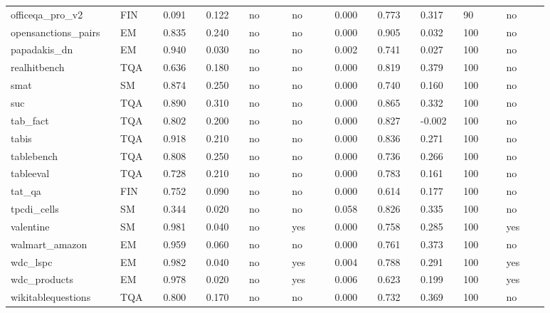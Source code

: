 \begin{landscape}
\begin{longtable}{p{0.147\linewidth}p{0.073\linewidth}p{0.073\linewidth}p{0.073\linewidth}p{0.073\linewidth}p{0.073\linewidth}p{0.073\linewidth}p{0.073\linewidth}p{0.073\linewidth}p{0.073\linewidth}p{0.073\linewidth}}
officeqa\_\allowbreak{}pro\_\allowbreak{}v2 & FIN & 0.091 & 0.122 & no & no & 0.000 & 0.773 & 0.317 & 90 & no \\
opensanctions\_\allowbreak{}pairs & EM & 0.835 & 0.240 & no & no & 0.000 & 0.905 & 0.032 & 100 & no \\
papadakis\_\allowbreak{}dn & EM & 0.940 & 0.030 & no & no & 0.002 & 0.741 & 0.027 & 100 & no \\
realhitbench & TQA & 0.636 & 0.180 & no & no & 0.000 & 0.819 & 0.379 & 100 & no \\
smat & SM & 0.874 & 0.250 & no & no & 0.000 & 0.740 & 0.160 & 100 & no \\
suc & TQA & 0.890 & 0.310 & no & no & 0.000 & 0.865 & 0.332 & 100 & no \\
tab\_\allowbreak{}fact & TQA & 0.802 & 0.200 & no & no & 0.000 & 0.827 & -0.002 & 100 & no \\
tabis & TQA & 0.918 & 0.210 & no & no & 0.000 & 0.836 & 0.271 & 100 & no \\
tablebench & TQA & 0.808 & 0.250 & no & no & 0.000 & 0.736 & 0.266 & 100 & no \\
tableeval & TQA & 0.728 & 0.210 & no & no & 0.000 & 0.783 & 0.161 & 100 & no \\
tat\_\allowbreak{}qa & FIN & 0.752 & 0.090 & no & no & 0.000 & 0.614 & 0.177 & 100 & no \\
tpcdi\_\allowbreak{}cells & SM & 0.344 & 0.020 & no & no & 0.058 & 0.826 & 0.335 & 100 & no \\
valentine & SM & 0.981 & 0.040 & no & yes & 0.000 & 0.758 & 0.285 & 100 & yes \\
walmart\_\allowbreak{}amazon & EM & 0.959 & 0.060 & no & no & 0.000 & 0.761 & 0.373 & 100 & no \\
wdc\_\allowbreak{}lspc & EM & 0.982 & 0.040 & no & yes & 0.004 & 0.788 & 0.291 & 100 & yes \\
wdc\_\allowbreak{}products & EM & 0.978 & 0.020 & no & yes & 0.006 & 0.623 & 0.199 & 100 & yes \\
wikitablequestions & TQA & 0.800 & 0.170 & no & no & 0.000 & 0.732 & 0.369 & 100 & no \\
\bottomrule
\end{longtable}
\normalsize
\end{landscape}
